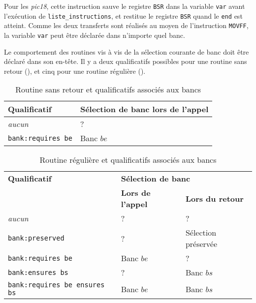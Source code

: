Pour les \emph{pic18}, cette instruction sauve le registre \texttt{BSR} dans la variable \texttt{var} avant l'exécution de \texttt{liste\_instructions}, et restitue le registre \texttt{BSR} quand le \texttt{end} est atteint. Comme les deux transferts sont réalisés au moyen de l'instruction \texttt{MOVFF}, la variable \texttt{var} peut être déclarée dans n'importe quel banc.




Le comportement des routines vis à vis de la sélection courante de banc doit être déclaré dans son en-tête. Il y a deux qualificatifs possibles pour une routine sans retour (), et cinq pour une routine régulière ().



\begin{table}[!ht]
  \centering
  \begin{tabular}{ll}
    \textbf{Qualificatif} & \textbf{Sélection de banc lors de l'appel} \\
    \hline
    \emph{aucun} & ?\\ 
    \texttt{bank:requires be} & Banc $be$\\ 
    \hline
  \end{tabular}
  \caption{Routine sans retour et qualificatifs associés aux bancs}
\end{table}

\begin{table}[!ht]
  \centering
  \begin{tabular}{lll}
    \textbf{Qualificatif} & \multicolumn{2}{l}{\bf Sélection de banc} \\
                          & \textbf{Lors de l'appel}  & \textbf{Lors du retour} \\
    \hline
    \emph{aucun} & ? & ?\\ 
    \texttt{bank:preserved} & ? & Sélection préservée\\ 
    \texttt{bank:requires be} & Banc $be$ & ?\\ 
    \texttt{bank:ensures bs} & ? & Banc $bs$\\ 
    \texttt{bank:requires be ensures bs} & Banc $be$ & Banc $bs$\\ 
    \hline
  \end{tabular}
  \caption{Routine régulière et qualificatifs associés aux bancs}
\end{table}

